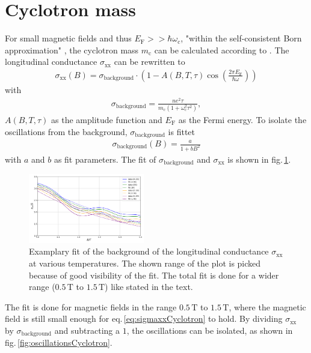 \section{Cyclotron mass}
For small magnetic fields and thus $E_\text{F}>>\hbar\omega_\text{c}$, "within the self-consistent Born approximation" \cite{Tasksheet}, the cyclotron mass $m_\text{c}$ can be calculated according to \cite{Ando}. 
The longitudinal conductance $\sigma_\text{xx}$ \cite{Ando} can be rewritten to
\begin{align}
    \sigma_\text{xx}(B) = \sigma_\text{background}\cdot\left(1-A(B,T,\tau)\cos{\left(\frac{2\pi E_\text{F}}{\hbar\omega}\right)}\right) \label{eq:sigmaxxCyclotron}
\end{align} 
with 
\begin{align}
    \sigma_\text{background}=\frac{ne^2\tau}{m_\text{c}(1+\omega_\text{c}^2\tau^2)},
\end{align}
$A(B,T,\tau)$ as the amplitude function and $E_\text{F}$ as the Fermi energy.
To isolate the oscillations from the background, $\sigma_\text{background}$ is fittet
\begin{align}
    \sigma_\text{background}(B) = \frac{a}{1+bB^2}
    \label{eq:fit}
\end{align}
with $a$ and $b$ as fit parameters. The fit of $\sigma_\text{background}$ and $\sigma_\text{xx}$ is shown in fig.\,\ref{fig:fitCyclotron}.
\begin{figure}[h]
    \centering
    \includegraphics[width=0.45\textwidth]{../Images/sigmaWithFit.png}
    \caption{Examplary fit of the background of the longitudinal conductance $\sigma_\text{xx}$ at various temperatures. 
    The shown range of the plot is picked because of good visibility of the fit. The total fit is done for a wider range ($0.5\,\text{T}$ to $1.5\,\text{T}$) like stated in the text.}
    \label{fig:fitCyclotron}
\end{figure}
The fit is done for magnetic fields in the range $0.5\,\text{T}$ to $1.5\,\text{T}$, where the magnetic field is still small enough for eq.\,\ref{eq:sigmaxxCyclotron} to hold.
By dividing $\sigma_\text{xx}$ by $\sigma_\text{background}$ and subtracting a $1$, the oscillations can be isolated, as shown in fig.\,\ref{fig:oscillationsCyclotron}.
